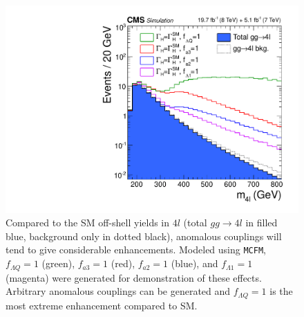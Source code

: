 \begin{figure}[htbp]
\begin{center}
\includegraphics[width=.7\linewidth]{HiggsProperties/figures/cCanvas_MCFMBSM_GenLevel.pdf}
\caption[Simulated Off-shell Enhancements in the $4l$ Channel from Anomalous $HVV$ Couplings]{Compared to the SM off-shell yields in $4l$ (total $gg\rightarrow 4l$ in filled blue, background only in dotted black), anomalous couplings will tend to give considerable enhancements. Modeled using {\tt MCFM}, $f_{\Lambda Q}=1$ (green), $f_{a3}=1$ (red), $f_{a2}=1$ (blue), and $f_{\Lambda 1}=1$ (magenta) were generated for demonstration of these effects. Arbitrary anomalous couplings can be generated and $f_{\Lambda Q}=1$ is the most extreme enhancement compared to SM.}
\label{fig:MCFMOffShellBSM}
\end{center}
\end{figure}

